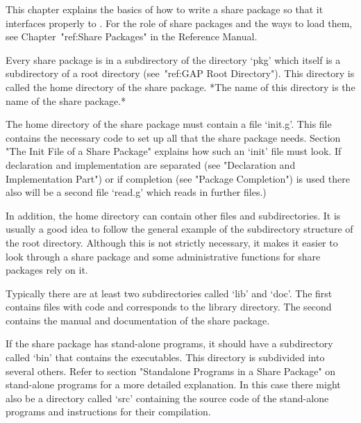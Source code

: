 

This chapter explains the basics of how to write a share package so that it
interfaces properly to {\GAP}.
For the role of share packages and the ways to load them,
see Chapter~"ref:Share Packages" in the Reference Manual.


Every share package is in a subdirectory of the directory `pkg' which
itself is a subdirectory of a {\GAP} root directory
(see~"ref:GAP Root Directory"). This directory is
called the home directory of the share package. *The name of this
directory is the name of the share package.*

The home directory of the share package must contain a file
`init.g'. This file contains the necessary {\GAP} code to set up all
that the share package needs. Section "The Init File of a Share
Package" explains how such an `init' file must look. If declaration
and implementation are separated (see "Declaration and Implementation
Part") or if completion (see "Package Completion") is used
there also will be a second file `read.g' which reads in
further files.)

In addition, the home directory can contain other files and
subdirectories. It is usually a good idea to follow the general
example of the subdirectory structure of the {\GAP} root directory.
Although this is not strictly necessary, it makes it easier to look
through a share package and some administrative functions for share
packages rely on it.

Typically there are at least two subdirectories called `lib' and
`doc'. The first contains files with {\GAP} code and corresponds to
the {\GAP} library directory. The second contains the manual and
documentation of the share package.

If the share package has stand-alone programs, it should have a
subdirectory called `bin' that contains the executables. This
directory is subdivided into several others. Refer to section
"Standalone Programs in a Share Package" on stand-alone programs for a
more detailed explanation. In this case there might also be a
directory called `src' containing the source code of the stand-alone
programs and instructions for their compilation.

